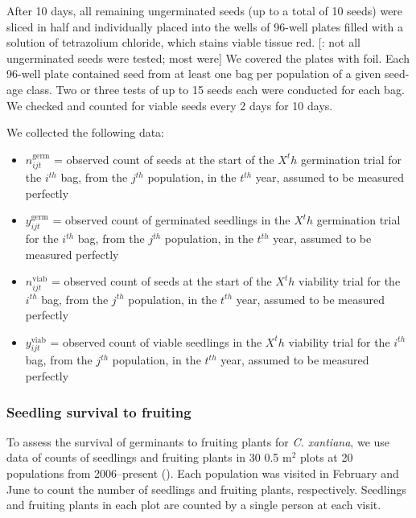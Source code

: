 \documentclass[12pt, oneside, titlepage]{article}   	%
\begin{document}
After 10 days, all remaining ungerminated seeds (up to a total of 10 seeds) were sliced in half and individually placed into the wells of 96-well plates filled with a solution of tetrazolium chloride, which stains viable tissue red. [\cite{eckhart2011}: not all ungerminated seeds were tested; most were] We covered the plates with foil. Each 96-well plate contained seed from at least one bag per population of a given seed-age class. Two or three tests of up to 15 seeds each were conducted for each bag. We checked and counted for viable seeds every 2 days for 10 days. 

We collected the following data: 

\begin{itemize}
	\item $n^{\mathrm{germ}}_{ijt}$ = observed count of seeds at the start of the $X^th$ germination trial for the $i^{th}$ bag, from the $j^{th}$ population, in the $t^{th}$ year, assumed to be measured perfectly
	\item $y^{\mathrm{germ}}_{ijt}$ = observed count of germinated seedlings in the $X^th$ germination trial for the $i^{th}$ bag, from the $j^{th}$ population, in the $t^{th}$ year, assumed to be measured perfectly 
	\item $n^{\mathrm{viab}}_{ijt}$ = observed count of seeds at the start of the $X^th$ viability trial for the $i^{th}$ bag, from the $j^{th}$ population, in the $t^{th}$ year, assumed to be measured perfectly 
	\item $y^{\mathrm{viab}}_{ijt}$ = observed count of viable seedlings in the $X^th$ viability trial for the $i^{th}$ bag, from the $j^{th}$ population, in the $t^{th}$ year, assumed to be measured perfectly 
\end{itemize}

\subsubsection*{Seedling survival to fruiting}

To assess the survival of germinants to fruiting plants for \textit{C. xantiana}, we use data of counts of seedlings and fruiting plants in 30 0.5 m$^2$ plots at 20 populations from 2006--present (\cite{eckhart2011}). Each population was visited in February and June to count the number of seedlings and fruiting plants, respectively. Seedlings and fruiting plants in each plot are counted by a single person at each visit. 
\end{document}
